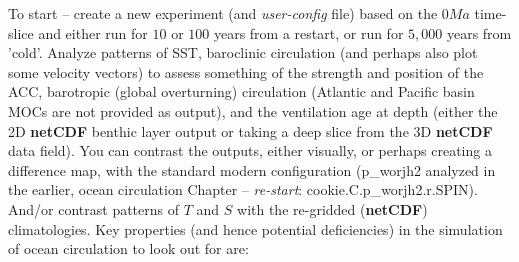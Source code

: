 \vspace{1mm}
To start -- create a new experiment (and \textit{user-config} file) based on the $0 Ma$ time-slice and either run for $10$ or $100$ years from a restart, or run for $5,000$ years from 'cold'. Analyze patterns of SST, baroclinic circulation (and perhaps also plot some velocity vectors) to assess  something of the strength and position of the ACC, barotropic (global overturning) circulation (Atlantic and Pacific basin MOCs are not provided as output), and the ventilation age at depth (either the 2D \textbf{netCDF} benthic layer output or taking a deep slice from the 3D \textbf{netCDF} data field). You can contrast the outputs, either visually, or perhaps creating a difference map, with the standard modern configuration (\textsf{\footnotesize p\_worjh2} analyzed in the earlier, ocean circulation Chapter -- \textit{re-start}: \textsf{\footnotesize cookie.C.p\_worjh2.r.SPIN}). And/or contrast patterns of $T$ and $S$ with the re-gridded (\textbf{netCDF}) climatologies. Key properties (and hence potential deficiencies) in the simulation of ocean circulation to look out for are:

